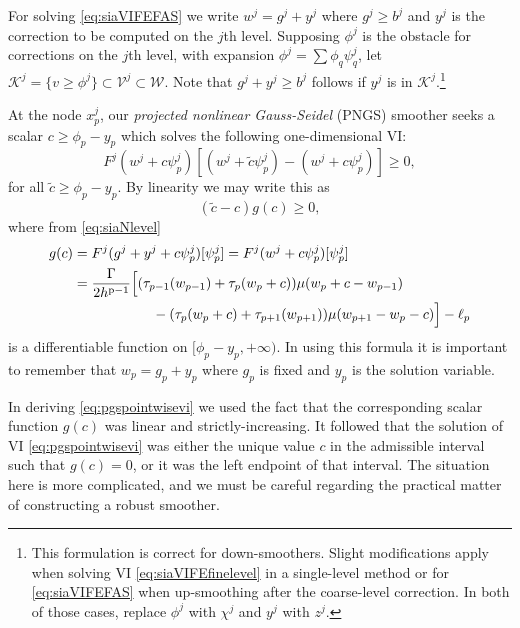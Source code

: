 \documentclass[letterpaper,final,12pt,reqno]{amsart}
\theoremstyle{claim}
\newcommand{\pp}{{\text{p}}}
\numberwithin{equation}{section}
\numberwithin{figure}{section}
\numberwithin{table}{section}
\numberwithin{theorem}{section}
\begin{document}
For solving \eqref{eq:siaVIFEFAS} we write $w^j=g^j+y^j$ where $g^j\ge b^j$ and $y^j$ is the correction to be computed on the $j$th level.  Supposing $\phi^j$ is the obstacle for corrections on the $j$th level, with expansion $\phi^j = \sum \phi_q \psi_q^j$, let $\mathcal{K}^j = \{v \ge \phi^j\} \subset \mathcal{V}^j \subset \mathcal{W}$.  Note that $g^j+y^j \ge b^j$ follows if $y^j$ is in $\mathcal{K}^j$.\footnote{This formulation is correct for down-smoothers.  Slight modifications apply when solving VI \eqref{eq:siaVIFEfinelevel} in a single-level method or for \eqref{eq:siaVIFEFAS} when up-smoothing after the coarse-level correction.  In both of those cases, replace $\phi^j$ with $\chi^j$ and $y^j$ with $z^j$.}

At the node $x_p^j$, our \emph{projected nonlinear Gauss-Seidel} (PNGS) smoother seeks a scalar $c \ge \phi_p - y_p$ which solves the following one-dimensional VI:
\begin{equation}
  F^j(w^j+c\psi_p^j)[(w^j+\tilde c\psi_p^j) - (w^j+c\psi_p^j)] \ge 0,  \label{eq:pngspointwiseviEARLY}
\end{equation}
for all $\tilde c \ge \phi_p - y_p$.  By linearity we may write this as
\begin{equation}
  (\tilde c - c) g(c) \ge 0,  \label{eq:pngspointwisevi}
\end{equation}
where from \eqref{eq:siaNlevel}
\begin{align}
  g(c) &= F^j(g^j+y^j+c\psi_p^j)[\psi_p^j] = F^j(w^j+c\psi_p^j)[\psi_p^j] \label{eq:pngspointwiseresidual} \\
       &= \frac{\Gamma}{2h^{\pp-1}} \Big[(\tau_{p-1}(w_{p-1}) + \tau_p(w_p +c)) \mu(w_p+c-w_{p-1}) \notag  \\
       &\hspace{20mm} - (\tau_p(w_p+c) + \tau_{p+1}(w_{p+1})) \mu(w_{p+1}-w_p-c)\Big] - \ell_p \notag
\end{align}
is a differentiable function on $[\phi_p - y_p,+\infty)$.  In using this formula it is important to remember that $w_p = g_p+y_p$ where $g_p$ is fixed and $y_p$ is the solution variable.

In deriving \eqref{eq:pgspointwisevi} we used the fact that the corresponding scalar function $g(c)$ was linear and strictly-increasing.  It followed that the solution of VI \eqref{eq:pgspointwisevi} was either the unique value $c$ in the admissible interval such that $g(c)=0$, or it was the left endpoint of that interval.  The situation here is more complicated, and we must be careful regarding the practical matter of constructing a robust smoother.
\end{document}

